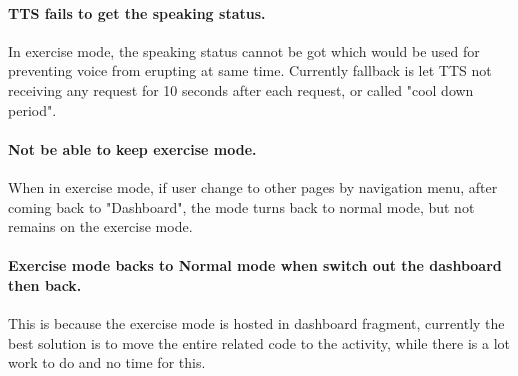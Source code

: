 \documentclass[10pt,a4paper,final]{scrartcl}
\begin{document}
\paragraph{TTS fails to get the speaking status.}
In exercise mode, the speaking status cannot be got which would be used for preventing voice from erupting at same time. Currently fallback is let TTS not receiving any request for 10 seconds after each request, or called "cool down period". 
\paragraph{Not be able to keep exercise mode.}
When in exercise mode, if user change to other pages by navigation menu, after coming back to "Dashboard", the mode turns back to normal mode, but not remains on the exercise mode. 
\paragraph{Exercise mode backs to Normal mode when switch out the dashboard then back.} This is because the exercise mode is hosted in dashboard fragment, currently the best solution is to move the entire related code to the activity, while there is a lot work to do and no time for this.
\end{document}
